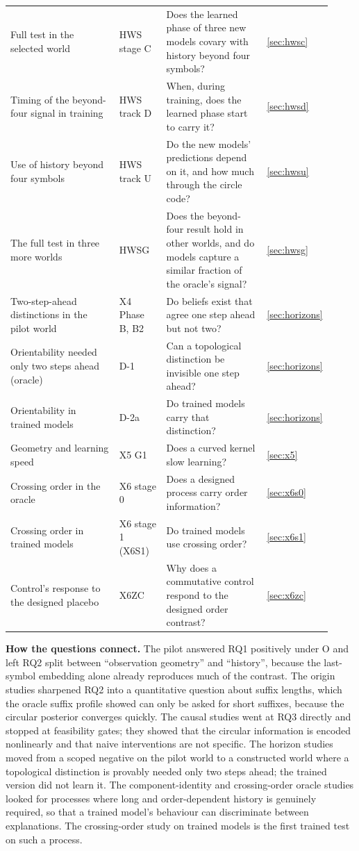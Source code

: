 \documentclass[11pt,a4paper]{article}
\DeclareRobustCommand{\_}{\ifmmode\origunderscore\else\textunderscore\allowbreak\fi}
\begin{document}
\begin{table}[p]
\begin{tabular}{@{}L{0.36\linewidth}L{0.15\linewidth}L{0.33\linewidth}L{0.08\linewidth}@{}}
Full test in the selected world & HWS stage C & Does the learned phase of three new models covary with history beyond four symbols? & \ref{sec:hwsc}\\
Timing of the beyond-four signal in training & HWS track D & When, during training, does the learned phase start to carry it? & \ref{sec:hwsd}\\
Use of history beyond four symbols & HWS track U & Do the new models' predictions depend on it, and how much through the circle code? & \ref{sec:hwsu}\\
The full test in three more worlds & HWSG & Does the beyond-four result hold in other worlds, and do models capture a similar fraction of the oracle's signal? & \ref{sec:hwsg}\\
Two-step-ahead distinctions in the pilot world & X4 Phase B, B2 & Do beliefs exist that agree one step ahead but not two? & \ref{sec:horizons}\\
Orientability needed only two steps ahead (oracle) & D-1 & Can a topological distinction be invisible one step ahead? & \ref{sec:horizons}\\
Orientability in trained models & D-2a & Do trained models carry that distinction? & \ref{sec:horizons}\\
Geometry and learning speed & X5 G1 & Does a curved kernel slow learning? & \ref{sec:x5}\\
Crossing order in the oracle & X6 stage 0 & Does a designed process carry order information? & \ref{sec:x6s0}\\
Crossing order in trained models & X6 stage 1 (X6S1) & Do trained models use crossing order? & \ref{sec:x6s1}\\
Control's response to the designed placebo & X6ZC & Why does a commutative control respond to the designed order contrast? & \ref{sec:x6zc}\\
\bottomrule
\end{tabular}
\end{table}

\textbf{How the questions connect.} The pilot answered RQ1 positively under O and left RQ2 split
between ``observation geometry'' and ``history'', because the last-symbol embedding alone
already reproduces much of the contrast. The origin studies sharpened
RQ2 into a quantitative question about suffix lengths, which the oracle suffix profile showed
can only be asked for short suffixes, because the circular posterior converges quickly. The
causal studies went at RQ3 directly and stopped at feasibility gates; they showed that the
circular information is encoded nonlinearly and that naive interventions are not specific. The
horizon studies moved from a scoped negative on the pilot world to a constructed world where a
topological distinction is provably needed only two steps ahead; the trained version did not
learn it. The component-identity and crossing-order oracle studies looked for processes where
long and order-dependent history is genuinely required, so that a trained model's behaviour can
discriminate between explanations. The crossing-order study on trained models is the first
trained test on such a process.
\end{document}
